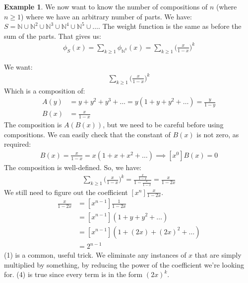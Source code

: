 \documentclass[]{article}
\theoremstyle{definition}
\newtheorem{ex}{Example}[section]
\newcommand{\union}{\cup}
\begin{document}
				\begin{ex}
					We now want to know the number of compositions of $n$ (where $n \ge 1$) where we have an arbitrary number of parts. We have: $S = \mathbb{N} \union \mathbb{N}^2 \union \mathbb{N}^3 \union \mathbb{N}^4 \union \mathbb{N}^5 \union \ldots$. The weight function is the same as before \textendash{} the sum of the parts. That gives us:
					\begin{align*}
						\phi_S(x) = \sum_{k \ge 1} \phi_{\mathbb{N}^k}(x) = \sum_{k \ge 1} \bigg( \frac{x}{1 - x} \bigg)^k
					\end{align*}

					We want:
					\begin{align*}
						[x^n]\sum_{k \ge 1} \bigg( \frac{x}{1 - x} \bigg)^k
					\end{align*}
					Which is a composition of:
					\begin{align*}
						A(y) &= y + y^2 + y^3 + \ldots = y(1 + y + y^2 + \ldots) = \frac{y}{1 - y} \\
						B(x) &= \frac{x}{1 - x}
					\end{align*}
					The composition is $A(B(x))$, but we need to be careful before using compositions. We can easily check that the constant of $B(x)$ is not zero, as required:
					\begin{align*}
						B(x) = \frac{x}{1 - x} = x(1 + x + x^2 + \ldots) \implies [x^0]B(x) = 0
					\end{align*}
					The composition is well-defined. So, we have:
					\begin{align*}
						\sum_{k \ge 1} \bigg( \frac{x}{1 - x} \bigg)^k = \frac{\frac{x}{1 - x}}{1 - \frac{x}{1 - x}} = \frac{x}{1 - 2x}
					\end{align*}
					We still need to figure out the coefficient $[x^n]\frac{x}{1 - 2x}$.
					\begin{align}
						[x^n] \frac{x}{1 - 2x} &= [x^{n - 1}] \frac{1}{1 - 2x} \\
						&= [x^{n - 1}](1 + y + y^2 + \ldots) \\
						&= [x^{n - 1}](1 + (2x) + (2x)^2 + \ldots) \\
						&= 2^{n - 1}
					\end{align}
					(1) is a common, useful trick. We eliminate any instances of $x$ that are simply multiplied by something, by reducing the power of the coefficient we're looking for. (4) is true since every term is in the form $(2x)^k$.
				\end{ex}
\end{document}
